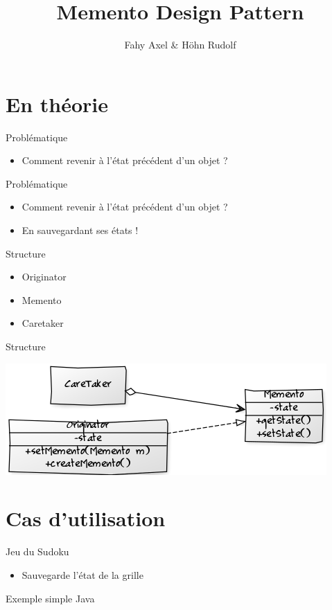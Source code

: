 \documentclass[11pt]{beamer}
\author{Fahy Axel \& Höhn Rudolf}
\title{Memento Design Pattern}
\institute{Conception orientée objet\\hepia}
\begin{document}
\begin{frame}
\titlepage
\end{frame}

\section{En théorie}

\begin{frame}{Problématique}
\begin{itemize}
    \item Comment revenir à l'état précédent d'un objet ?
\end{itemize}
\end{frame}

\begin{frame}{Problématique}
\begin{itemize}
    \item Comment revenir à l'état précédent d'un objet ?
    \item En sauvegardant ses états !
\end{itemize}
\end{frame}

\begin{frame}{Structure}
\begin{itemize}
    \item Originator
    \item Memento
    \item Caretaker
\end{itemize}
\end{frame}

\begin{frame}{Structure}
\begin{center}
\includegraphics[scale=0.55]{../diagrams/memento_classic.png}
\end{center}
\end{frame}

\section{Cas d'utilisation}
\begin{frame}{Jeu du Sudoku}
\begin{itemize}
    \item Sauvegarde l'état de la grille
\end{itemize}
\end{frame}

\begin{frame}{Exemple simple Java}

\end{frame}
\end{document}
